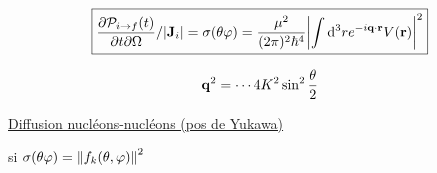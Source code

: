 $$ \boxed{\frac{\partial\mathcal{P}_{i\to{}f}(t)}{\partial t \partial \Omega}/\abs{\vb{J}_i} = \sigma(\theta \varphi) = \frac{\mu^2}{(2\pi)^2\hbar^4} \abs{\int \dd^3 r e^{-i\vb{q} \cdot \vb{r}} V(\vb{r})}^2} $$ 



$$\vb{q}^2 = \dotsb 4K^2 \sin^2 \frac{\theta}{2} $$ 

\underline{Diffusion nucléons-nucléons (pos de Yukawa)} 

si $\sigma(\theta \varphi) = \norm{f_k (\theta, \varphi)}^2    $  








